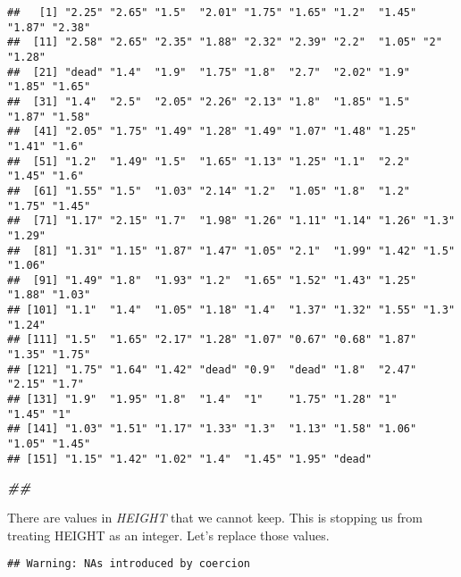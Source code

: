 \documentclass[
]{article}
\newenvironment{Shaded}{\begin{snugshade}}{\end{snugshade}}
\newcommand{\DocumentationTok}[1]{\textcolor[rgb]{0.56,0.35,0.01}{\textbf{\textit{#1}}}}
\newcommand{\FunctionTok}[1]{\textcolor[rgb]{0.00,0.00,0.00}{#1}}
\newcommand{\NormalTok}[1]{#1}
\newcommand{\OtherTok}[1]{\textcolor[rgb]{0.56,0.35,0.01}{#1}}
\newcommand{\SpecialCharTok}[1]{\textcolor[rgb]{0.00,0.00,0.00}{#1}}
\begin{document}
\begin{verbatim}
##   [1] "2.25" "2.65" "1.5"  "2.01" "1.75" "1.65" "1.2"  "1.45" "1.87" "2.38"
##  [11] "2.58" "2.65" "2.35" "1.88" "2.32" "2.39" "2.2"  "1.05" "2"    "1.28"
##  [21] "dead" "1.4"  "1.9"  "1.75" "1.8"  "2.7"  "2.02" "1.9"  "1.85" "1.65"
##  [31] "1.4"  "2.5"  "2.05" "2.26" "2.13" "1.8"  "1.85" "1.5"  "1.87" "1.58"
##  [41] "2.05" "1.75" "1.49" "1.28" "1.49" "1.07" "1.48" "1.25" "1.41" "1.6" 
##  [51] "1.2"  "1.49" "1.5"  "1.65" "1.13" "1.25" "1.1"  "2.2"  "1.45" "1.6" 
##  [61] "1.55" "1.5"  "1.03" "2.14" "1.2"  "1.05" "1.8"  "1.2"  "1.75" "1.45"
##  [71] "1.17" "2.15" "1.7"  "1.98" "1.26" "1.11" "1.14" "1.26" "1.3"  "1.29"
##  [81] "1.31" "1.15" "1.87" "1.47" "1.05" "2.1"  "1.99" "1.42" "1.5"  "1.06"
##  [91] "1.49" "1.8"  "1.93" "1.2"  "1.65" "1.52" "1.43" "1.25" "1.88" "1.03"
## [101] "1.1"  "1.4"  "1.05" "1.18" "1.4"  "1.37" "1.32" "1.55" "1.3"  "1.24"
## [111] "1.5"  "1.65" "2.17" "1.28" "1.07" "0.67" "0.68" "1.87" "1.35" "1.75"
## [121] "1.75" "1.64" "1.42" "dead" "0.9"  "dead" "1.8"  "2.47" "2.15" "1.7" 
## [131] "1.9"  "1.95" "1.8"  "1.4"  "1"    "1.75" "1.28" "1"    "1.45" "1"   
## [141] "1.03" "1.51" "1.17" "1.33" "1.3"  "1.13" "1.58" "1.06" "1.05" "1.45"
## [151] "1.15" "1.42" "1.02" "1.4"  "1.45" "1.95" "dead"
\end{verbatim}

\begin{Shaded}
\begin{Highlighting}[]
\DocumentationTok{\#\#}
\end{Highlighting}
\end{Shaded}

There are values in \emph{HEIGHT} that we cannot keep. This is stopping
us from treating HEIGHT as an integer. Let's replace those values.

\begin{Shaded}
\end{Shaded}

\begin{verbatim}
## Warning: NAs introduced by coercion
\end{verbatim}

\begin{Shaded}
\end{Shaded}
\end{document}
